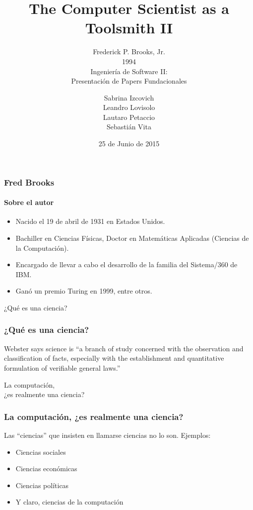 \documentclass[spanish]{beamer}
\title{The Computer Scientist as a Toolsmith II}
\subtitle{
  Frederick P. Brooks, Jr. \\
  1994 \\
  \vspace{2em}
  Ingeniería de Software II: \\
  Presentación de Papers Fundacionales
}
\author{
  Sabrina Izcovich \\
  Leandro Lovisolo \\
  Lautaro Petaccio \\
  Sebastián Vita
}
\date{25 de Junio de 2015}
\institute{
  Departamento de Computación \\
  Facultad de Ciencias Exactas y Naturales \\
  Universidad de Buenos Aires
}
\begin{document}
\begin{frame}
  \titlepage
\end{frame}

\begin{frame}
  \frametitle{Fred Brooks}
  \framesubtitle{Sobre el autor}

  \pause

  \begin{itemize}
    \item Nacido el 19 de abril de 1931 en Estados Unidos.

    \pause

    \item Bachiller en Ciencias Físicas, Doctor en Matemáticas Aplicadas
      (Ciencias de la Computación).

    \pause

    \item Encargado de llevar a cabo el desarrollo de la familia del
      Sistema/360 de IBM.

    \pause

    \item Ganó un premio Turing en 1999, entre otros.
  \end{itemize}
\end{frame}

\begin{frame}
  \begin{center}
    \Huge{
      ¿Qué es una ciencia?
    }
  \end{center}
\end{frame}

\begin{frame}
  \frametitle{¿Qué es una ciencia?}

  Webster says science is ``a branch of study concerned
  with the observation and classification of facts, especially
  with the establishment and quantitative formulation
  of verifiable general laws.''
\end{frame}

\begin{frame}
  \begin{center}
    \Huge{
      La computación,\\
      ¿es realmente una ciencia?
    }
  \end{center}
\end{frame}

\begin{frame}
  \frametitle{La computación, ¿es realmente una ciencia?}

  Las ``ciencias'' que insisten en llamarse ciencias no lo son.
  \pause
  Ejemplos:
  \pause

  \begin{itemize}
    \item Ciencias sociales \pause
    \item Ciencias económicas \pause
    \item Ciencias políticas \pause
    \item Y claro, ciencias de la computación
  \end{itemize}
\end{frame}
\end{document}

